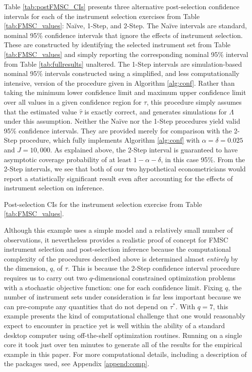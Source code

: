 Table \ref{tab:postFMSC_CIs} presents three alternative post-selection confidence intervals for each of the instrument selection exercises from Table \ref{tab:FMSC_values}: Na\"{i}ve, 1-Step, and 2-Step.
The Na\"{i}ve intervals are standard, nominal 95\% confidence intervals that ignore the effects of instrument selection.
These are constructed by identifying the selected instrument set from Table \ref{tab:FMSC_values} and simply reporting the corresponding nominal 95\% interval from Table \ref{tab:fullresults} unaltered.
The 1-Step intervals are simulation-based nominal 95\% intervals constructed using a simplified, and less computationally intensive, version of the procedure given in Algorithm \ref{alg:conf}.
Rather than taking the minimum lower confidence limit and maximum upper confidence limit over all values in a given confidence region for $\tau$, this procedure simply assumes that the estimated value $\widehat{\tau}$ is exactly correct, and generates simulations for $\Lambda$ under this assumption.
Neither the Na\"{i}ve nor the 1-Step procedures yield valid 95\% confidence intervals.
They are provided merely for comparison with the 2-Step procedure, which fully implements Algorithm \ref{alg:conf} with $\alpha = \delta = 0.025$ and $J=10,000$. 
As explained above, the 2-Step interval is guaranteed to have asymptotic coverage probability of at least $1 - \alpha - \delta$, in this case 95\%.
From the 2-Step intervals, we see that both of our two hypothetical econometricians would report a statistically significant result even after accounting for the effects of instrument selection on inference.

\begin{table}[htbp]
	\centering
	
	\caption{Post-selection CIs for the instrument selection exercise from Table \ref{tab:FMSC_values}.}
	\label{tab:postFMSC_CIs}
\end{table}

Although this example uses a simple model and a relatively small number of observations, it nevertheless provides a realistic proof of concept for FMSC instrument selection and post-selection inference because the computational complexity of the procedures described above is determined almost \emph{entirely} by the dimension, $q$, of $\tau$. 
This is because the 2-Step confidence interval procedure requires us to carry out two $q$-dimensional constrained optimization problems with a stochastic objective function: one for each confidence limit.
Fixing $q$, the number of instrument sets under consideration is far less important because we can pre-compute any quantities that do not depend on $\tau^*$.
With $q = 7$, this example presents the kind of computational challenge that one would reasonably expect to encounter in practice yet is well within the ability of a standard desktop computer using off-the-shelf optimization routines.
Running on a single core it took just over ten minutes to generate all of the results for the empirical example in this paper.
For more computational details, including a description of the packages used, see Appendix \ref{append:comp}. 
